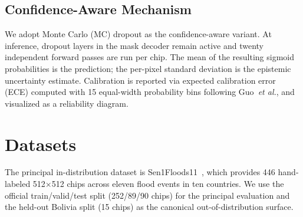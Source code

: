 \documentclass[conference]{IEEEtran}
\begin{document}
\subsection{Confidence-Aware Mechanism}

We adopt Monte Carlo (MC) dropout as the confidence-aware variant. At inference, dropout layers in the mask decoder remain active and twenty independent forward passes are run per chip. The mean of the resulting sigmoid probabilities is the prediction; the per-pixel standard deviation is the epistemic uncertainty estimate. Calibration is reported via expected calibration error (ECE) computed with 15 equal-width probability bins following Guo~\textit{et al.}, and visualized as a reliability diagram.

\section{Datasets}
\label{sec:datasets}

The principal in-distribution dataset is Sen1Floods11~\cite{Bonafilia2020Sen1Floods11}, which provides 446 hand-labeled 512$\times$512 chips across eleven flood events in ten countries. We use the official train/valid/test split (252/89/90 chips) for the principal evaluation and the held-out Bolivia split (15 chips) as the canonical out-of-distribution surface.
\end{document}

